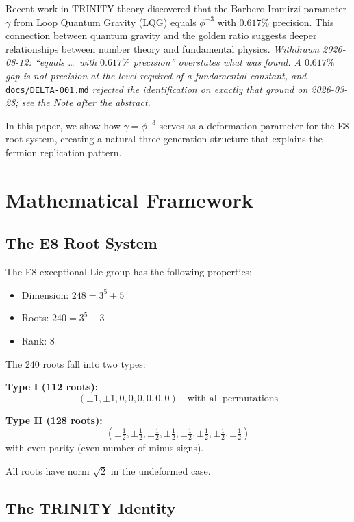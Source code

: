 \documentclass[12pt,a4paper]{article}
\begin{document}
Recent work in TRINITY theory discovered that the Barbero-Immirzi parameter $\gamma$ from Loop Quantum Gravity (LQG) equals $\phi^{-3}$ with $0.617\%$ precision. This connection between quantum gravity and the golden ratio suggests deeper relationships between number theory and fundamental physics.
\emph{Withdrawn 2026-08-12: ``equals \ldots\ with $0.617\%$ precision'' overstates what was found. A $0.617\%$ gap is not precision at the level required of a fundamental constant, and} \texttt{docs/DELTA-001.md} \emph{rejected the identification on exactly that ground on 2026-03-28; see the Note after the abstract.}

In this paper, we show how $\gamma = \phi^{-3}$ serves as a deformation parameter for the E8 root system, creating a natural three-generation structure that explains the fermion replication pattern.

\section{Mathematical Framework}

\subsection{The E8 Root System}

The E8 exceptional Lie group has the following properties:
\begin{itemize}
\item Dimension: $248 = 3^5 + 5$
\item Roots: $240 = 3^5 - 3$
\item Rank: $8$
\end{itemize}

The 240 roots fall into two types:

\textbf{Type I (112 roots):}
\begin{equation}
(\pm 1, \pm 1, 0, 0, 0, 0, 0, 0) \quad \text{with all permutations}
\end{equation}

\textbf{Type II (128 roots):}
\begin{equation}
(\pm \tfrac{1}{2}, \pm \tfrac{1}{2}, \pm \tfrac{1}{2}, \pm \tfrac{1}{2}, \pm \tfrac{1}{2}, \pm \tfrac{1}{2}, \pm \tfrac{1}{2}, \pm \tfrac{1}{2})
\end{equation}
with even parity (even number of minus signs).

All roots have norm $\sqrt{2}$ in the undeformed case.

\subsection{The TRINITY Identity}
\end{document}
